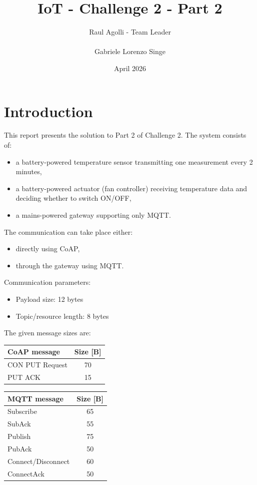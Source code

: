 \documentclass[a4paper,12pt]{article}
\title{IoT - Challenge 2 - Part 2}
\author{Raul Agolli - Team Leader \\\\ Gabriele Lorenzo Singe}
\date{April 2026}
\begin{document}
\maketitle

\section{Introduction}

This report presents the solution to Part 2 of Challenge 2.
The system consists of:
\begin{itemize}[leftmargin=1.5cm]
    \item a battery-powered temperature sensor transmitting one measurement every 2 minutes,
    \item a battery-powered actuator (fan controller) receiving temperature data and deciding whether to switch ON/OFF,
    \item a mains-powered gateway supporting only MQTT.
\end{itemize}

The communication can take place either:
\begin{itemize}[leftmargin=1.5cm]
    \item directly using CoAP,
    \item through the gateway using MQTT.
\end{itemize}

Communication parameters:
\begin{itemize}
    \item Payload size: 12 bytes
    \item Topic/resource length: 8 bytes
\end{itemize}



The given message sizes are:
\begin{center}
\begin{tabular}{l c}
\toprule
\textbf{CoAP message} & \textbf{Size [B]} \\
\midrule
CON PUT Request & 70 \\
PUT ACK & 15 \\
\bottomrule
\end{tabular}
\hspace{1cm}
\begin{tabular}{l c}
\toprule
\textbf{MQTT message} & \textbf{Size [B]} \\
\midrule
Subscribe & 65 \\
SubAck & 55 \\
Publish & 75 \\
PubAck & 50 \\
Connect/Disconnect & 60 \\
ConnectAck & 50 \\
\bottomrule
\end{tabular}
\end{center}
\end{document}
